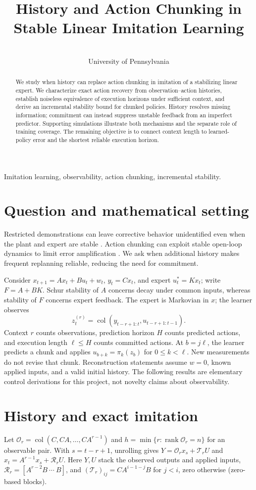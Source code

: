 \documentclass{l4dc2026}
\title[History and Action Chunking]{History and Action Chunking in Stable Linear Imitation Learning}
\author{\Name{Nihar Ballamudi}\and\Name{Kyle Horton}\\
\addr University of Pennsylvania}
\begin{document}
\maketitle
\begin{abstract}
We study when history can replace action chunking in imitation of a stabilizing linear expert. We characterize exact action recovery from observation--action histories, establish noiseless equivalence of execution horizons under sufficient context, and derive an incremental stability bound for chunked policies. History resolves missing information; commitment can instead suppress unstable feedback from an imperfect predictor. Supporting simulations illustrate both mechanisms and the separate role of training coverage. The remaining objective is to connect context length to learned-policy error and the shortest reliable execution horizon.
\end{abstract}
\begin{keywords}
Imitation learning, observability, action chunking, incremental stability.
\end{keywords}

\section{Question and mathematical setting}
Restricted demonstrations can leave corrective behavior unidentified even when the plant and expert are stable \citep{simchowitz2025}. Action chunking can exploit stable open-loop dynamics to limit error amplification \citep{zhang2025}. We ask when additional history makes frequent replanning reliable, reducing the need for commitment.

Consider $x_{t+1}=Ax_t+Bu_t+w_t$, $y_t=Cx_t$, and expert $u_t^*=Kx_t$; write $F=A+BK$. Schur stability of $A$ concerns decay under common inputs, whereas stability of $F$ concerns expert feedback. The expert is Markovian in $x$; the learner observes
\[
z_t^{(r)}=\operatorname{col}(y_{t-r+1:t},u_{t-r+1:t-1}).
\]
Context $r$ counts observations, prediction horizon $H$ counts predicted actions, and execution length $\ell\le H$ counts committed actions. At $b=j\ell$, the learner predicts a chunk and applies $u_{b+k}=\pi_k(z_b)$ for $0\le k<\ell$. New measurements do not revise that chunk. Reconstruction statements assume $w=0$, known applied inputs, and a valid initial history. The following results are elementary control derivations for this project, not novelty claims about observability.

\section{History and exact imitation}
Let $\mathcal O_r=\operatorname{col}(C,CA,\ldots,CA^{r-1})$ and $h=\min\{r:\operatorname{rank}\mathcal O_r=n\}$ for an observable pair. With $s=t-r+1$, unrolling gives $Y=\mathcal O_rx_s+\mathcal T_rU$ and $x_t=A^{r-1}x_s+\mathcal R_rU$. Here $Y,U$ stack the observed outputs and applied inputs, $\mathcal R_r=[A^{r-2}B\ \cdots\ B]$, and $(\mathcal T_r)_{ij}=CA^{i-1-j}B$ for $j<i$, zero otherwise (zero-based blocks).
\end{document}
